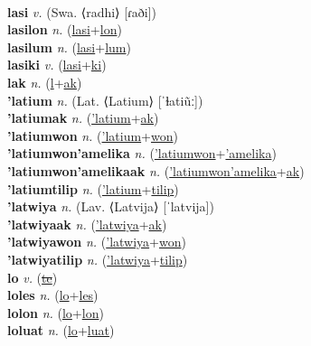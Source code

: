  \label{'lasapuactilip} \\
\textbf{lasi} \textit{v.} (Swa. ⟨radhi⟩ [ɾaði])
 \label{lasi} \\
\textbf{lasilon} \textit{n.} (\hyperref[lasi]{lasi}+\hyperref[lon]{lon})
 \label{lasilon} \\
\textbf{lasilum} \textit{n.} (\hyperref[lasi]{lasi}+\hyperref[lum]{lum})
 \label{lasilum} \\
\textbf{lasiki} \textit{v.} (\hyperref[lasi]{lasi}+\hyperref[ki]{ki})
 \label{lasiki} \\
\textbf{lak} \textit{n.} (\hyperref[l]{l}+\hyperref[ak]{ak})
 \label{lak} \\
\textbf{'latium} \textit{n.} (Lat. ⟨Latium⟩ [ˈɫatiũː])
 \label{'latium} \\
\textbf{'latiumak} \textit{n.} (\hyperref['latium]{'latium}+\hyperref[ak]{ak})
 \label{'latiumak} \\
\textbf{'latiumwon} \textit{n.} (\hyperref['latium]{'latium}+\hyperref[won]{won})
 \label{'latiumwon} \\
\textbf{'latiumwon'amelika} \textit{n.} (\hyperref['latiumwon]{'latiumwon}+\hyperref['amelika]{'amelika})
 \label{'latiumwon'amelika} \\
\textbf{'latiumwon'amelikaak} \textit{n.} (\hyperref['latiumwon'amelika]{'latiumwon'amelika}+\hyperref[ak]{ak})
 \label{'latiumwon'amelikaak} \\
\textbf{'latiumtilip} \textit{n.} (\hyperref['latium]{'latium}+\hyperref[tilip]{tilip})
 \label{'latiumtilip} \\
\textbf{'latwiya} \textit{n.} (Lav. ⟨Latvija⟩ [ˈlatvija])
 \label{'latwiya} \\
\textbf{'latwiyaak} \textit{n.} (\hyperref['latwiya]{'latwiya}+\hyperref[ak]{ak})
 \label{'latwiyaak} \\
\textbf{'latwiyawon} \textit{n.} (\hyperref['latwiya]{'latwiya}+\hyperref[won]{won})
 \label{'latwiyawon} \\
\textbf{'latwiyatilip} \textit{n.} (\hyperref['latwiya]{'latwiya}+\hyperref[tilip]{tilip})
 \label{'latwiyatilip} \\
\textbf{lo} \textit{v.} (\hyperref[te]{\sout{te}})
 \label{lo} \\
\textbf{loles} \textit{n.} (\hyperref[lo]{lo}+\hyperref[les]{les})
 \label{loles} \\
\textbf{lolon} \textit{n.} (\hyperref[lo]{lo}+\hyperref[lon]{lon})
 \label{lolon} \\
\textbf{loluat} \textit{n.} (\hyperref[lo]{lo}+\hyperref[luat]{luat})
 \label{loluat} \\
